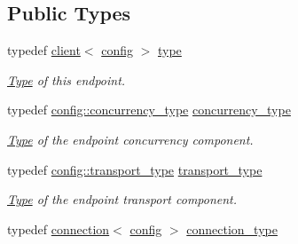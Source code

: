\subsection*{Public Types}
\begin{DoxyCompactItemize}
\item 
\mbox{\label{classwebsocketpp_1_1client_a8da6c7d382f7cae9567a7a1f1f2dd666}} 
typedef \mbox{\hyperlink{classwebsocketpp_1_1client}{client}}$<$ \mbox{\hyperlink{classconfig}{config}} $>$ \mbox{\hyperlink{classwebsocketpp_1_1client_a8da6c7d382f7cae9567a7a1f1f2dd666}{type}}
\begin{DoxyCompactList}\small\item\em \mbox{\hyperlink{struct_type}{Type}} of this endpoint. \end{DoxyCompactList}\item 
\mbox{\label{classwebsocketpp_1_1client_a404ec215508a5553d3a2295fdd82977e}} 
typedef \mbox{\hyperlink{classwebsocketpp_1_1concurrency_1_1none}{config\+::concurrency\+\_\+type}} \mbox{\hyperlink{classwebsocketpp_1_1client_a404ec215508a5553d3a2295fdd82977e}{concurrency\+\_\+type}}
\begin{DoxyCompactList}\small\item\em \mbox{\hyperlink{struct_type}{Type}} of the endpoint concurrency component. \end{DoxyCompactList}\item 
\mbox{\label{classwebsocketpp_1_1client_a042957cf1c89e7a4c39cf1ec26046e2d}} 
typedef \mbox{\hyperlink{classwebsocketpp_1_1transport_1_1asio_1_1endpoint}{config\+::transport\+\_\+type}} \mbox{\hyperlink{classwebsocketpp_1_1client_a042957cf1c89e7a4c39cf1ec26046e2d}{transport\+\_\+type}}
\begin{DoxyCompactList}\small\item\em \mbox{\hyperlink{struct_type}{Type}} of the endpoint transport component. \end{DoxyCompactList}\item 
\mbox{\label{classwebsocketpp_1_1client_a29c9f0410ed33a331faac19f8efea874}} 
typedef \mbox{\hyperlink{classwebsocketpp_1_1connection}{connection}}$<$ \mbox{\hyperlink{classconfig}{config}} $>$ \mbox{\hyperlink{classwebsocketpp_1_1client_a29c9f0410ed33a331faac19f8efea874}{connection\+\_\+type}}

\end{DoxyCompactItemize}
